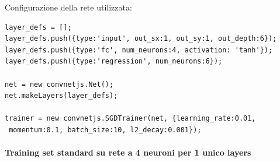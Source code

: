 \documentclass[11pt,a4paper,italian]{article}
\begin{document}
Configurazione della rete utilizzata:\\
\begin{verbatim}layer_defs = [];
layer_defs.push({type:'input', out_sx:1, out_sy:1, out_depth:6});
layer_defs.push({type:'fc', num_neurons:4, activation: 'tanh'});
layer_defs.push({type:'regression', num_neurons:6});

net = new convnetjs.Net();
net.makeLayers(layer_defs);

trainer = new convnetjs.SGDTrainer(net, {learning_rate:0.01,
 momentum:0.1, batch_size:10, l2_decay:0.001});
\end{verbatim}

\paragraph{Training set standard su rete a 4 neuroni per 1 unico layers}\mbox{}
\label{Training set standard su rete a 4 neuroni per 1 unico layers}
\\
\noindent
\end{document}
